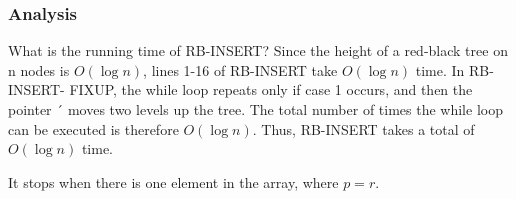 \subsubsection*{Analysis}

What is the running time of RB-INSERT? Since the height of a red-black tree on n
nodes is $O(\log n)$, lines 1-16 of RB-INSERT take $O(\log n)$ time. In RB-INSERT-
FIXUP, the while loop repeats only if case 1 occurs, and then the pointer ´ moves
two levels up the tree. The total number of times the while loop can be executed
is therefore $O(\log n)$. Thus, RB-INSERT takes a total of $O(\log n)$ time.

\begin{observationblock}
It stops when there is one element in the array, where $p=r$.
\end{observationblock}








